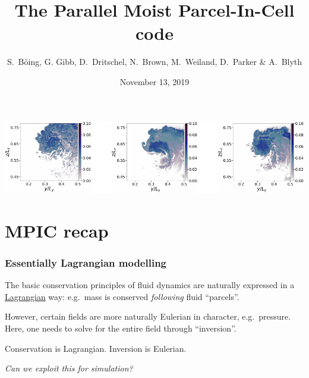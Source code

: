 \documentclass{beamer}
\title[MPIC]{The Parallel Moist Parcel-In-Cell code}
\author[B\"oing, Gibb, Dritschel, et al.]{{S.\ B\"oing, G. Gibb, D.\ Dritschel, N.\ Brown, M.\ Weiland, D.\ Parker \& A.\ Blyth}\vspace{-0.5cm}}
\institute[]{{Universities of Leeds \& St Andrews \& EPCC}\vspace{-0.4cm}}
\date{November 13, 2019}
\def\gr#1{\color{dark_green} #1}
\def\re#1{\color{red}   #1}
\def\bl#1{\color{blue}  #1}
\def\pu#1{\color{purple} #1}
\begin{document}
\begin{frame}

\titlepage %

\vspace{-0.6cm}
\begin{center}
  \includegraphics[width = \textwidth]{pmpic_images/croppedfig_les.pdf}
\end{center}


\end{frame}

\begin{frame}

\tableofcontents
\end{frame}

\section{MPIC recap}

\begin{frame}
\frametitle{Essentially Lagrangian modelling}

\begin{block}{}
{\bl The basic conservation principles} of fluid dynamics 
{\gr are naturally expressed} in a \underline{\pu Lagrangian} way: 
e.g.\ mass is conserved {\it \re following} fluid ``parcels''.
\end{block}

\vspace{0.5cm}
{\re However}, certain fields are more naturally Eulerian in character,
e.g.\ pressure.  Here, one needs to solve for the entire field through
``inversion''.

\vspace{0.3cm}
\begin{block}{}
{\gr Conservation is Lagrangian.}  {\pu Inversion is Eulerian.}  
\end{block}

\vspace{0.5cm}
{\it Can we exploit this for simulation?}

\end{frame}
\end{document}
